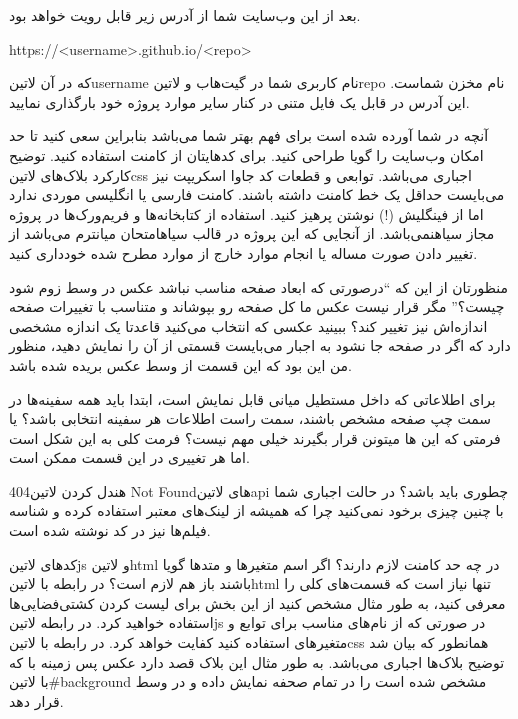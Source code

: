 \documentclass[../main.tex]{subfiles}
\begin{document}
بعد از این وب‌سایت شما از آدرس زیر قابل رویت خواهد بود.

\begin{latin}\begin{center}
https://<username>.github.io/<repo>
\end{center}\end{latin}

که در آن ‌لاتین{username} نام کاربری شما در گیت‌هاب و ‌لاتین{repo} نام مخزن شماست. این آدرس در قابل یک فایل متنی در کنار سایر موارد پروژه خود بارگذاری نمایید.


 آنچه در شما آورده شده است برای فهم بهتر شما می‌باشد بنابراین سعی کنید تا حد امکان وب‌سایت را گویا طراحی کنید.
 برای کدهایتان از کامنت استفاده کنید. توضیح کارکرد بلاک‌های ‌لاتین{css} اجباری می‌باشد. توابعی و قطعات کد جاوا اسکریپت نیز می‌بایست حداقل یک خط کامنت داشته باشند.
 کامنت فارسی یا انگلیسی موردی ندارد اما از فینگلیش (!) نوشتن پرهیز کنید.
 استفاده از کتابخانه‌ها و فریم‌ورک‌ها در پروژه مجاز ‌سیاه{نمی‌باشد}.
 از آنجایی که این پروژه در قالب ‌سیاه{امتحان میانترم} می‌باشد از تغییر دادن صورت مساله یا انجام موارد خارج از موارد مطرح شده خودداری کنید.


 منظورتان از این که ``درصورتی که ابعاد صفحه مناسب نباشد عکس در وسط زوم شود چیست؟''
مگر قرار نیست عکس ما کل صفحه رو بپوشاند و متناسب با تغییرات صفحه اندازه‌اش نیز تغییر کند؟
 ببینید عکسی که انتخاب می‌کنید قاعدتا یک اندازه مشخصی دارد که اگر در صفحه جا نشود به اجبار می‌بایست
قسمتی از آن را نمایش دهید، منظور من این بود که این قسمت از وسط عکس بریده شده باشد.

 برای اطلاعاتی که داخل مستطیل میانی قابل نمایش است،
ابتدا باید همه سفینه‌ها در سمت چپ صفحه مشخص باشند، سمت راست اطلاعات هر سفینه انتخابی باشد؟ یا فرمتی که این ها میتونن قرار بگیرند خیلی مهم نیست؟
 فرمت کلی به این شکل است اما هر تغییری در این قسمت ممکن است.

 هندل کردن ‌لاتین{404 Not Found}های ‌لاتین{api} چطوری باید باشد؟
 در حالت اجباری شما با چنین چیزی برخود نمی‌کنید چرا که همیشه از لینک‌های معتبر استفاده کرده
و شناسه فیلم‌ها نیز در کد نوشته شده است.

 کدهای ‌لاتین{js} و ‌لاتین{html} در چه حد کامنت لازم دارند؟ اگر اسم متغیرها و متدها گویا باشند باز هم لازم است؟
 در رابطه با ‌لاتین{html} تنها نیاز است که قسمت‌های کلی را معرفی کنید،
به طور مثال مشخص کنید از این بخش برای لیست کردن کشتی‌فضایی‌ها استفاده خواهید کرد.
در رابطه ‌لاتین{js} در صورتی که از نام‌های مناسب برای توابع و متغیرهای استفاده کنید کفایت خواهد کرد.
در رابطه با ‌لاتین{css} همانطور که بیان شد توضیح بلاک‌ها اجباری می‌باشد.
به طور مثال این بلاک قصد دارد عکس پس زمینه با که با ‌لاتین{\#background} مشخص شده است را در تمام صحفه نمایش داده و در وسط قرار دهد.

\end{document}
